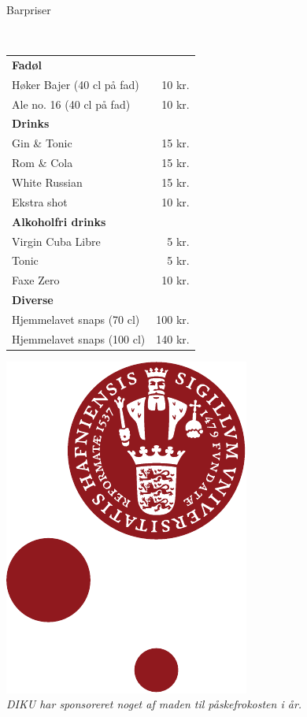 \begin{flushleft}
\begin{huge}
Barpriser
\end{huge}
\\[.1cm]
\begin{table}[h!]
\begin{tabular}{lr}
\textbf{Fadøl} & \\
Høker Bajer (40 cl på fad) & 10 kr.\\
Ale no. 16 (40 cl på fad) & 10 kr.\\
\textbf{Drinks} & \\
Gin \& Tonic & 15 kr.\\
Rom \& Cola & 15 kr.\\
White Russian & 15 kr.\\
Ekstra shot & 10 kr.\\[2ex]
\textbf{Alkoholfri drinks} & \\
Virgin Cuba Libre & 5 kr.\\
Tonic & 5 kr.\\
Faxe Zero & 10 kr.\\[2ex]
\textbf{Diverse} & \\
Hjemmelavet snaps (70 cl) & 100 kr.\\
Hjemmelavet snaps (100 cl) & 140 kr.\\
\end{tabular}
\end{table}
\end{flushleft}
\vfill
\begin{center}
\includegraphics[width=.2\linewidth]{figures/KULogo.pdf}
\\[2mm]\emph{DIKU har sponsoreret noget af maden til påskefrokosten i år.}
\end{center}
